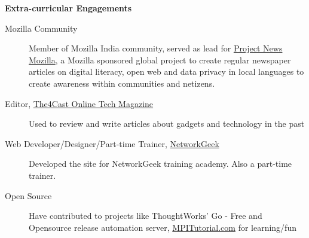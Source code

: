 \documentclass[letterpaper,11pt]{article}
\newcommand{\resheading}[1]{{\large \colorbox{mygrey}{\begin{minipage}{\textwidth}{\textbf{#1 \vphantom{p\^{E}}}}\end{minipage}}}}
\begin{document}
\resheading{Extra-curricular Engagements} 

	\begin{description}
		\item[Mozilla Community] {\footnotesize Member of Mozilla India community, served as lead for \href{https://wiki.mozilla.org/NeMo}{Project News Mozilla}, a Mozilla sponsored global project to create regular newspaper articles on digital literacy, open web and data privacy in local languages to create awareness within communities and netizens. }
		\item[Editor, \href{http://www.the4cast.com/author/dwarak}{The4Cast Online Tech Magazine}] {\footnotesize Used to review and write articles about gadgets and technology in the past}
		\item[Web Developer/Designer/Part-time Trainer, \href{https://www.networkgeek.in/}{NetworkGeek}] {\footnotesize Developed the site for NetworkGeek training academy. Also a part-time trainer.}
		\item[Open Source] {\footnotesize{ Have contributed to projects like ThoughtWorks' Go - Free and  Opensource release automation server, \href{https://mpitutorial.com/about/}{MPITutorial.com} for learning/fun}}
	\end{description}
\end{document}
